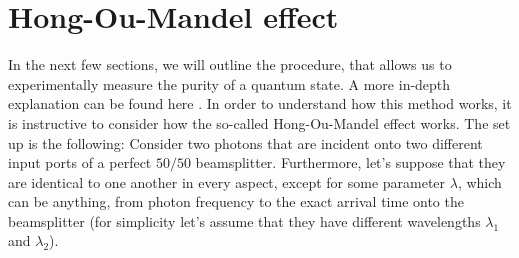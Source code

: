 \section{Hong-Ou-Mandel effect}
In the next few sections, we will outline the procedure, that allows us to experimentally measure the purity of a quantum state. A more in-depth explanation can be found here \cite{preiss thesis}. In order to understand how this method works, it is instructive to consider how  the so-called Hong-Ou-Mandel effect \cite{HOM} works. The set up is the following: Consider two photons that are incident onto two different input ports of a perfect $50/50$ beamsplitter. Furthermore, let's suppose that they are identical to one another in every aspect, except for some parameter $\lambda$, which can be anything, from photon frequency to the exact arrival time onto the beamsplitter (for simplicity let's assume that they have different wavelengths $\lambda_1$ and $\lambda_2$).

